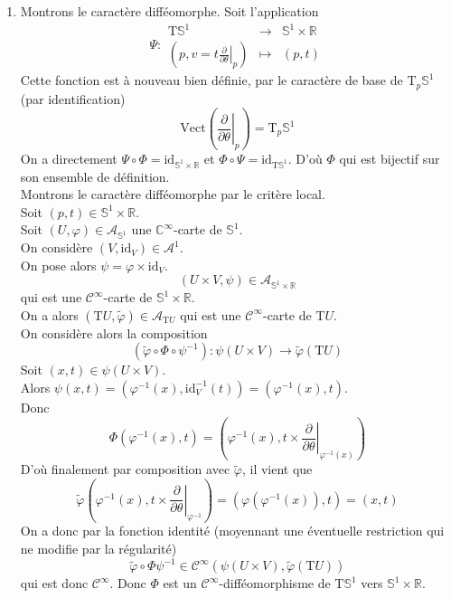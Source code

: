 \documentclass[../exercices.tex]{subfiles}
\begin{document}
\begin{enumerate}
		\item Montrons le caractère difféomorphe.
			Soit l'application
			$$
				\Psi :
				\begin{array}{rcl}
					\mathrm{T} \mathbb{S}^{1} & \longrightarrow & \mathbb{S}^{1} \times \mathbb{R} \\
					\displaystyle \left( p, v = t \left. \frac{\partial}{\partial \theta} \right|_{p} \right) & \longmapsto & (p, t)
				\end{array}
			$$
			Cette fonction est à nouveau bien définie, par le caractère de base de $\mathrm{T}_{p} \mathbb{S}^{1}$ (par identification)
			$$
				\mathrm{Vect} \! \left( \left. \frac{\partial}{\partial \theta} \right|_{p} \right) = \mathrm{T}_{p} \mathbb{S}^{1}
			$$
			On a directement $\Psi \circ \Phi = \mathrm{id}_{\mathbb{S}^{1} \times \mathbb{R}}$ et $\Phi \circ \Psi = \mathrm{id}_{\mathrm{T} \mathbb{S}^{1}}$.
			D'où $\Phi$ qui est bijectif sur son ensemble de définition. \\
			Montrons le caractère difféomorphe par le critère local. \\
			Soit $(p, t) \in \mathbb{S}^{1} \times \mathbb{R}$. \\
			Soit $(U, \varphi) \in \mathcal{A}_{\mathbb{S}^{1}}$ une $\mathbb{C}^{\infty}$-carte de $\mathbb{S}^{1}$. \\
			On considère $(V, \mathrm{id}_{V}) \in \mathcal{A}^{1}$. \\
			On pose alors $\psi = \varphi \times \mathrm{id}_{V}$.
			$$
				(U \times V, \psi) \in \mathcal{A}_{\mathbb{S}^{1} \times \mathbb{R}}
			$$
			qui est une $\mathscr{C}^{\infty}$-carte de $\mathbb{S}^{1} \times \mathbb{R}$. \\
			On a alors $(\mathrm{T} U, \tilde{\varphi}) \in \mathcal{A}_{\mathrm{T} U}$ qui est une $\mathscr{C}^{\infty}$-carte de $\mathrm{T} U$. \\
			On considère alors la composition
			$$
				(\tilde{\varphi} \circ \Phi \circ \psi^{-1}) : \psi(U \times V) \longrightarrow \tilde{\varphi}(\mathrm{T} U)
			$$
			Soit $(x, t) \in \psi(U \times V)$. \\
			Alors $\psi(x, t) = (\varphi^{-1}(x), \mathrm{id}_{V}^{-1}(t)) = (\varphi^{-1}(x), t)$. \\
			Donc
			$$
				\Phi(\varphi^{-1}(x), t) = \left( \varphi^{-1}(x), t \times \left. \frac{\partial}{\partial \theta} \right|_{\varphi^{-1}(x)} \right)
			$$
			D'où finalement par composition avec $\tilde{\varphi}$, il vient que
			$$
				\tilde{\varphi} \! \left( \varphi^{-1}(x), t \times \left. \frac{\partial}{\partial \theta} \right|_{\varphi^{-1}} \right) = (\varphi(\varphi^{-1}(x)), t) = (x, t)
			$$
			On a donc par la fonction identité (moyennant une éventuelle restriction qui ne modifie par la régularité)
			$$
				\tilde{\varphi} \circ \Phi \psi^{-1} \in \mathscr{C}^{\infty}(\psi(U \times V), \tilde{\varphi}(\mathrm{T} U))
			$$
			qui est donc $\mathscr{C}^{\infty}$. Donc $\Phi$ est un $\mathscr{C}^{\infty}$-difféomorphisme de $\mathrm{T} \mathbb{S}^{1}$ vers $\mathbb{S}^{1} \times \mathbb{R}$.
	\end{enumerate}
\end{document}

